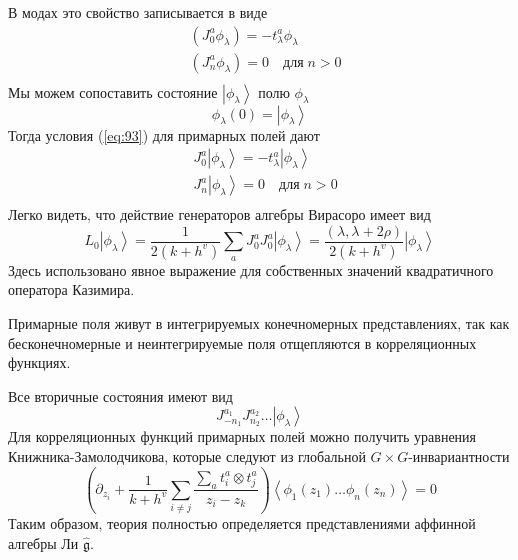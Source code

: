 \documentclass[a4paper,12pt]{article}
\theoremstyle{definition} \newtheorem{Def}{Definition}
\begin{document}
В модах это свойство записывается в виде
\begin{equation}
  \label{eq:93}
  \begin{aligned}
    & (J_0^a \phi_{\lambda})=-t^a_{\lambda}\phi_{\lambda}\\
    & (J^a_n\phi_{\lambda})=0\quad \mbox{для}\; n>0\\
  \end{aligned}
\end{equation}
Мы можем сопоставить состояние $\left|\phi_{\lambda}\right>$ полю $\phi_{\lambda}$
  \begin{equation}
    \label{eq:94}
    \phi_{\lambda}(0)=\left|\phi_{\lambda}\right>
  \end{equation}
Тогда условия  (\ref{eq:93}) для примарных полей  дают
\begin{equation}
  \label{eq:95}
  \begin{aligned}
    & J_0^a\left|\phi_{\lambda}\right>=-t^a_{\lambda}\left|\phi_{\lambda}\right>\\
    & J^a_n\left|\phi_{\lambda}\right>=0 \quad \mbox{для}\; n>0 \\
  \end{aligned}
\end{equation}
Легко видеть, что действие генераторов алгебры Вирасоро имеет вид
\begin{equation}
  \label{eq:96}
  L_0\left|\phi_{\lambda}\right>=\frac{1}{2(k+h^v)}\sum_aJ^a_0J^a_0\left|\phi_{\lambda}\right>=\frac{(\lambda,\lambda+2\rho)}{2(k+h^v)}\left|\phi_{\lambda}\right>
\end{equation}
Здесь использовано явное выражение для собственных значений квадратичного оператора Казимира.

Примарные поля живут в интегрируемых конечномерных представлениях, так как бесконечномерные и неинтегрируемые поля отщепляются в корреляционных функциях.

Все вторичные состояния имеют вид
\begin{equation}
  \label{eq:97}
  J^{a_1}_{-n_1}J^{a_2}_{n_2}\dots\left|\phi_{\lambda}\right>
\end{equation}
Для корреляционных функций примарных полей можно получить уравнения Книжника-Замолодчикова, которые следуют из глобальной $G\times G$-инвариантности
\begin{equation}
  \label{eq:98}
  \left(\partial_{z_i}+\frac{1}{k+h^v}\sum_{i\neq j}\frac{\sum_a t^a_i\otimes t^a_j}{z_i-z_k}\right)
  \left<\phi_1(z_1)\dots \phi_n(z_n)\right>=0
\end{equation}
Таким образом, теория полностью определяется представлениями аффинной алгебры Ли $\hat{\mathfrak{g}} $.
\end{document}
